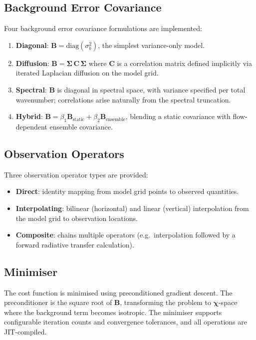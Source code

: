 \documentclass[11pt,a4paper]{article}
\begin{document}
\subsection{Background Error Covariance}

Four background error covariance formulations are implemented:
\begin{enumerate}[nosep]
  \item \textbf{Diagonal}: $\bm B = \mathrm{diag}(\sigma_b^2)$, the simplest variance-only model.
  \item \textbf{Diffusion}: $\bm B = \bm\Sigma\,\bm C\,\bm\Sigma$ where $\bm C$ is a correlation matrix defined implicitly via iterated Laplacian diffusion on the model grid.
  \item \textbf{Spectral}: $\bm B$ is diagonal in spectral space, with variance specified per total wavenumber; correlations arise naturally from the spectral truncation.
  \item \textbf{Hybrid}: $\bm B = \beta_1\bm B_{\mathrm{static}} + \beta_2\bm B_{\mathrm{ensemble}}$, blending a static covariance with flow-dependent ensemble covariance.
\end{enumerate}

\subsection{Observation Operators}

Three observation operator types are provided:
\begin{itemize}[nosep]
  \item \textbf{Direct}: identity mapping from model grid points to observed quantities.
  \item \textbf{Interpolating}: bilinear (horizontal) and linear (vertical) interpolation from the model grid to observation locations.
  \item \textbf{Composite}: chains multiple operators (e.g.\ interpolation followed by a forward radiative transfer calculation).
\end{itemize}

\subsection{Minimiser}

The cost function is minimised using preconditioned gradient descent.  The preconditioner is the square root of $\bm B$, transforming the problem to $\bm\chi$-space where the background term becomes isotropic.  The minimiser supports configurable iteration counts and convergence tolerances, and all operations are JIT-compiled.
\end{document}
